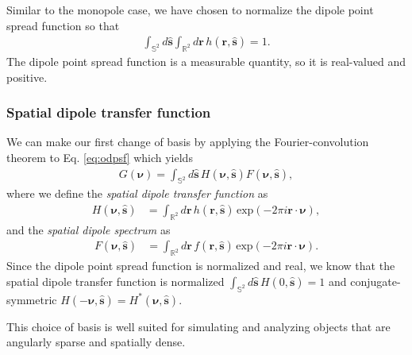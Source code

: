 \documentclass[]{osa-article}
\providecommand{\mb}[1]{\mathbf{#1}}
\providecommand{\mh}[1]{\mathbf{\hat{#1}}}
\providecommand{\mbb}[1]{\mathbb{#1}}
\providecommand{\bs}[1]{\boldsymbol{#1}}
\begin{document}
Similar to the monopole case, we have chosen to normalize the dipole point
spread function so that
\begin{align}
  \int_{\mbb{S}^2}d\mh{s}\int_{\mbb{R}^2}d\mb{r}\, h(\mb{r}, \mh{s}) = 1. 
\end{align}
The dipole point spread function is a measurable quantity, so it is real-valued
and positive.

\subsubsection{Spatial dipole transfer function}
We can make our first change of basis by applying the Fourier-convolution
theorem to Eq. \ref{eq:odpsf} which yields
\begin{align}
G(\bs{\nu}) = \int_{\mbb{S}^2}d\mh{s}\, H(\bs{\nu}, \mh{s})F(\bs{\nu}, \mh{s}) \label{eq:odotf},
\end{align}
where we define the \textit{spatial dipole transfer function} as
  \begin{align}
  H(\bs{\nu}, \mh{s}) &= \int_{\mbb{R}^2}d\mb{r}\, h(\mb{r}, \mh{s})\, \text{exp}(-2\pi i\mb{r}\cdot\bs{\nu}),
  \end{align}
  and the \textit{spatial dipole spectrum} as
  \begin{align}
  F(\bs{\nu}, \mh{s}) &= \int_{\mbb{R}^2}d\mb{r}\, f(\mb{r}, \mh{s})\, \text{exp}(-2\pi i\mb{r}\cdot\bs{\nu}). 
  \end{align}
  Since the dipole point spread function is normalized and real, we know that
  the spatial dipole transfer function is normalized
  $\int_{\mbb{S}^2}d\mh{s}\, H(0, \mh{s}) = 1$ and conjugate-symmetric
  $H(-\bs{\nu}, \mh{s}) = H^*(\bs{\nu}, \mh{s})$.
  
  This choice of basis is well suited for simulating and analyzing objects that
  are angularly sparse and spatially dense.
\end{document}
